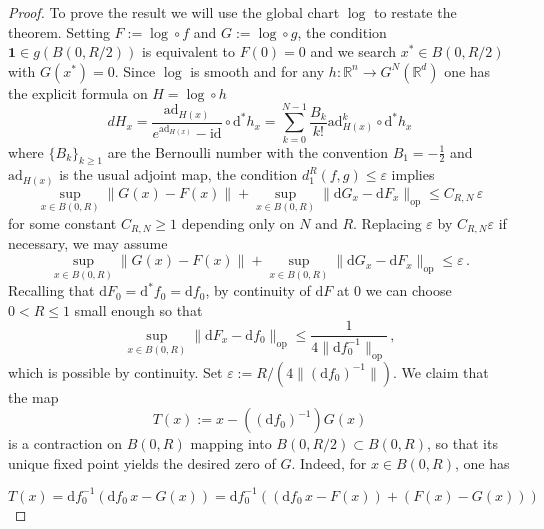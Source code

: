 \documentclass[12pt,a4paper]{article}
\numberwithin{equation}{section}
\theoremstyle{plain}
\theoremstyle{definition}
\theoremstyle{remark}
\begin{document}
\begin{proof}
To prove the result we will use the global chart $\log$ to restate the theorem. Setting $F := \log \circ f$ and $G := \log \circ g$, the condition
$\mathbf{1} \in g(B(0,R/2))$ is equivalent to $F(0)=0$ and we search $x^* \in B(0,R/2)$ with
$G(x^*)=0$. Since $\log$ is smooth and for any $h\colon \mathbb{R}^n \to G^N(\mathbb{R}^d)$ one has the explicit formula on $H= \log \circ h$
\[dH_x=\frac{\text{ad}_{H(x)}}{e^{\text{ad}_{H(x)}}- \text{id}}\circ \mathrm{d}^* h_x=\sum_{k=0}^{N-1}\frac{B_k}{k!}\text{ad}^k_{H(x)}\circ \mathrm{d}^* h_x\]
where $\{B_k\}_{k\geq 1}$ are the Bernoulli number with the convention $B_1=- \frac{1}{2}$ and $\text{ad}_{H(x)}$ is the usual adjoint map, the condition $d_1^R(f,g)\leq \varepsilon$ implies
\[
    \sup_{x\in B(0,R)}\|G(x) - F(x)\| +    \sup_{x\in B(0,R)}\|\mathrm{d}G_x - \mathrm{d}F_x\|_{\text{op}} \leq C_{R,N}\,\varepsilon
\]
for some constant $C_{R,N} \geq 1$ depending only on $N$ and $R$. Replacing $\varepsilon$ by $C_{R,N}\varepsilon$ if necessary, we may assume
\begin{equation}\label{eq:closeness}
    \sup_{x\in B(0,R)}\|G(x) - F(x)\| +    \sup_{x\in B(0,R)}\|\mathrm{d}G_x - \mathrm{d}F_x\|_{\text{op}}\leq \varepsilon\,.
\end{equation}
Recalling that $\mathrm{d}F_0= \mathrm{d}^*f_0=\mathrm{d}f_0 $, by continuity of $\mathrm{d}F$ at $0$ we can choose $0<R \leq 1$ small enough  so that
\begin{equation}\label{eq:R}
    \sup_{x \in B(0,R)} \|\mathrm{d}F_x - \mathrm{d}f_0\|_{\text{op}}
    \leq \frac{1}{4\|\mathrm{d}f_0^{-1}\|_{\text{op}}}\,,
\end{equation}
which is possible by continuity. Set $\varepsilon := R/(4\|(\mathrm{d}f_0)^{-1}\|)$. We claim that the map
\[
    T(x) := x - ((\mathrm{d}f_0)^{-1})G(x)
\]
is a contraction on $B(0,R)$ mapping into $B(0,R/2)\subset B(0,R)$, so that its unique fixed point yields the desired zero of $G$.  Indeed, for
$x\in B(0,R)$, one has 

\[T(x) = \mathrm{d}f_0^{-1}(\mathrm{d}f_0\,x - G(x))= \mathrm{d}f_0^{-1}\left((\mathrm{d}f_0\,x - F(x)) + (F(x)-G(x))\right)\]


\end{proof}
\end{document}
